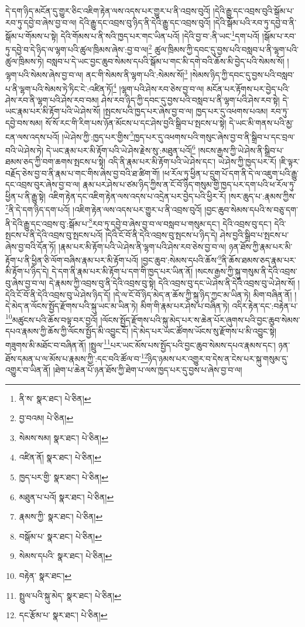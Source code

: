 དེ་དག་ཉིད་མངོན་དུ་གྱུར་ཅིང་འཇིག་རྟེན་ལས་འདས་པར་གྱུར་པ་ནི་འབྲས་བུའོ། །དེའི་རྒྱུ་དང་འབྲས་བུའི་སྒོམ་པ་རབ་ཏུ་དབྱེ་བ་ཞེས་བྱ་བ་ལ། དེའི་རྒྱུ་དང་འབྲས་བུ་ཉིད་ནི་དེའི་རྒྱུ་དང་འབྲས་བུའོ། །དེའི་སྒོམ་པའི་རབ་ཏུ་དབྱེ་བ་ནི་སྒོམ་པ་གོམས་པ་སྟེ། དེའི་གོམས་པ་ནི་སའི་ཁྱད་པར་གང་ཡིན་པའོ། །དེའི་བྱ་བ་:ནི་ཡང་\footnote{ནི་ས་  སྣར་ཐང་།  པེ་ཅིན། }དག་པའོ། །སྒོམ་པ་རབ་ཏུ་དབྱེ་བ་དེ་ཉིད་ལ་ལྷག་པའི་ཚུལ་ཁྲིམས་ཞེས་:བྱ་བ་ལ།\footnote{བྱ་བའམ།  པེ་ཅིན། } ཚུལ་ཁྲིམས་ཀྱི་དབང་དུ་བྱས་པའི་བསླབ་པ་ནི་ལྷག་པའི་ཚུལ་ཁྲིམས་ཏེ། བསླབ་པ་དེ་ཡང་བྱང་ཆུབ་སེམས་དཔའི་སྒོམ་པ་གང་མི་དགེ་བའི་ཆོས་མི་བྱེད་པའི་སེམས་སོ། །ལྷག་པའི་སེམས་ཞེས་བྱ་བ་ལ། ནང་གི་སེམས་ནི་ལྷག་པའི་:སེམས་སོ།\footnote{སེམས་སམ།  སྣར་ཐང་།  པེ་ཅིན། } །སེམས་ཉིད་ཀྱི་དབང་དུ་བྱས་པའི་བསླབ་པ་ནི་ལྷག་པའི་སེམས་ཏེ་ཏིང་ངེ་:འཛིན་ཏོ།\footnote{འཛིན་ནོ།  སྣར་ཐང་།  པེ་ཅིན། } །ལྷག་པའི་ཤེས་རབ་ཅེས་བྱ་བ་ལ། མངོན་པར་རྟོགས་པར་བྱེད་པའི་ཤེས་རབ་ནི་ལྷག་པའི་ཤེས་རབ་བམ། ཤེས་རབ་ཉིད་ཀྱི་དབང་དུ་བྱས་པའི་བསླབ་པ་ནི་ལྷག་པའི་ཤེས་རབ་སྟེ། དེ་ཡང་རྣམ་པར་མི་རྟོག་པའི་ཡེ་ཤེས་སོ། །སྤངས་པའི་ཁྱད་པར་ཞེས་བྱ་བ་ལ། ཁྱད་པར་དུ་འཕགས་པའམ། རབ་ཏུ་དབྱེ་བས་སམ། སོ་སོ་རང་གི་རིག་པས་ཉོན་མོངས་པ་དང་ཤེས་བྱའི་སྒྲིབ་པ་སྤངས་པ་སྟེ། དེ་ཡང་མི་གནས་པའི་མྱ་ངན་ལས་འདས་པའོ། །ཡེ་ཤེས་ཀྱི་:ཁྱད་པར་གྱིས་\footnote{ཁྱད་པར་གྱི་  སྣར་ཐང་།  པེ་ཅིན། }ཁྱད་པར་དུ་འཕགས་པའི་གསུང་ཞེས་བྱ་བ་ནི་སྒྲིབ་པ་དང་བྲལ་བའི་ཡེ་ཤེས་ཏེ། དེ་ཡང་རྣམ་པར་མི་རྟོག་པའི་ཡེ་ཤེས་རྗེས་སུ་:མཐུན་པའོ།\footnote{མཐུན་པ་པའོ།  སྣར་ཐང་།  པེ་ཅིན། } །སངས་རྒྱས་ཀྱི་ཡེ་ཤེས་ནི་སྒྲིབ་པ་ཐམས་ཅད་ཀྱི་བག་ཆགས་སྤངས་པ་སྟེ། འདི་ནི་རྣམ་པར་མི་རྟོག་པའི་ཡེ་ཤེས་དང་། ཡེ་ཤེས་ཀྱི་ཁྱད་པར་རོ། །ཇི་ལྟར་བརྗོད་ཅེས་བྱ་བ་ནི་རྣམ་པ་གང་གིས་ཞེས་བྱ་བའི་ཐ་ཚིག་གོ། །ཕ་རོལ་ཏུ་ཕྱིན་པ་དྲུག་པོ་དག་ནི་དེ་ལ་འཇུག་པའི་རྒྱུ་དང་འབྲས་བུར་ཞེས་བྱ་བ་ལ། རྣམ་པར་ཤེས་པ་ཙམ་ཉིད་ཀྱིས་ན་ངོ་བོ་ཉིད་གསུམ་གྱི་ཁྱད་པར་དག་པའི་ཕ་རོལ་ཏུ་ཕྱིན་པ་ནི་རྒྱུ་སྟེ། འཇིག་རྟེན་དང་འཇིག་རྟེན་ལས་འདས་པ་འདྲེན་པར་བྱེད་པའི་ཕྱིར་རོ། །སར་ཆུད་པ་:རྣམས་ཀྱིས་\footnote{རྣམས་ཀྱི་  སྣར་ཐང་།  པེ་ཅིན། }ནི་དེ་དག་ཉིད་དག་པའོ། །འཇིག་རྟེན་ལས་འདས་པར་གྱུར་པ་ནི་འབྲས་བུའོ། །བྱང་ཆུབ་སེམས་དཔའི་ས་བཅུ་དག་ནི་དེའི་རྒྱུ་དང་འབྲས་བུ་:སྒོམ་པ་\footnote{བསྒོམ་པ་  སྣར་ཐང་།  པེ་ཅིན། }རབ་ཏུ་དབྱེ་བ་ཞེས་བྱ་བ་ལ་བསླབ་པ་གསུམ་དང་། དེའི་འབྲས་བུ་དང་། དེའི་སྤངས་པ་ནི་དེའི་འབྲས་བུ་སྤངས་པའོ། །དེའི་ངོ་བོ་ནི་དེའི་འབྲས་བུ་སྤངས་པ་ཉིད་དེ། ཤེས་བྱའི་སྒྲིབ་པ་སྤངས་པ་ཞེས་བྱ་བའི་དོན་ཏོ། །རྣམ་པར་མི་རྟོག་པའི་ཡེ་ཤེས་ནི་ལྷག་པའི་ཤེས་རབ་ཅེས་བྱ་བ་ལ། ཉན་ཐོས་ཀྱི་རྣམ་པར་མི་རྟོག་པ་ནི་ཕྱིན་ཅི་ལོག་བཞིས་རྣམ་པར་མི་རྟོག་པའོ། །བྱང་ཆུབ་:སེམས་དཔའི་ཆོས་\footnote{སེམས་དཔའི་  སྣར་ཐང་།  པེ་ཅིན། }ནི་ཆོས་ཐམས་ཅད་རྣམ་པར་མི་རྟོག་པ་ཉིད་དེ། དེ་དག་ནི་རྣམ་པར་མི་རྟོག་པ་དག་གི་ཁྱད་པར་ཡིན་ནོ། །སངས་རྒྱས་ཀྱི་སྐུ་གསུམ་ནི་དེའི་འབྲས་བུ་ཞེས་བྱ་བ་ལ། དེ་རྣམས་ཀྱི་འབྲས་བུ་ནི་དེའི་འབྲས་བུ་སྟེ། དེའི་འབྲས་བུ་དང་ཡེ་ཤེས་ནི་དེའི་འབྲས་བུ་ཡེ་ཤེས་སོ། །དེའི་ངོ་བོ་ནི་དེའི་འབྲས་བུ་ཡེ་ཤེས་ཉིད་དོ། །དེ་ལ་ངོ་བོ་ཉིད་མེད་ན་ཆོས་ཀྱི་སྐུ་ཉིད་ཀྱང་མ་ཡིན་ཏེ། མིག་བཞིན་ནོ། །དེ་མེད་ན་ལོངས་སྤྱོད་རྫོགས་པའི་སྐུ་ཡང་མ་ཡིན་ཏེ། མིག་གི་རྣམ་པར་ཤེས་པ་བཞིན་ཏེ། འདིར་རྟེན་དང་:བརྟེན་པ་\footnote{བརྟེན་  སྣར་ཐང་། }མཚུངས་པའི་ཆོས་བལྟ་བར་བྱའོ། །ལོངས་སྤྱོད་རྫོགས་པའི་སྐུ་མེད་པར་ས་ཆེན་པོར་ཞུགས་པའི་བྱང་ཆུབ་སེམས་དཔའ་རྣམས་ཀྱི་ཆོས་ཀྱི་ལོངས་སྤྱོད་མི་འབྱུང་ངོ། །དེ་མེད་པར་ཡང་ཚོགས་ཡོངས་སུ་རྫོགས་པ་མི་འབྱུང་སྟེ། གཟུགས་མི་མཐོང་བ་བཞིན་ནོ། །སྤྲུལ་\footnote{སྤྲུལ་པའི་སྐུ་མེད་  སྣར་ཐང་།  པེ་ཅིན། }པར་ཡང་མོས་པས་སྤྱོད་པའི་བྱང་ཆུབ་སེམས་དཔའ་རྣམས་དང་། ཉན་ཐོས་དམན་པ་ལ་མོས་པ་རྣམས་ཀྱི་:དང་བའི་ཚོལ་བ་\footnote{དང་རྩོམ་པ་  སྣར་ཐང་།  པེ་ཅིན། }ཉིད་ཉམས་པར་འགྱུར་བ་དེས་ན་ངེས་པར་སྐུ་གསུམ་དུ་འགྱུར་བ་ཡིན་ནོ། །ཐེག་པ་ཆེན་པོ་ཉན་ཐོས་ཀྱི་ཐེག་པ་ལས་ཁྱད་པར་དུ་བྱས་པ་ཞེས་བྱ་བ་ལ། 